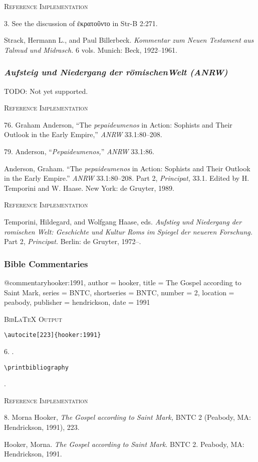 \documentclass[a4paper]{article}
\newcommand{\gr}[1]{{\greekfont #1}}
\newcommand\citetestns[3]{%
  {\textsc{BibLaTeX Output}\par
   \nobreak
   \texttt{\textbackslash autocite[#2]\{#3\}}\par
   \color{biblatex-colour}
   #1. \cite[#2]{#3}.\par
   \color{black}
   \texttt{\textbackslash printbibliography}\par
   \color{biblatex-colour}
   \hangindent\bibindent\bibentrycite{#3}.\par}}
\newenvironment{refimp}{%
  \begin{minipage}{\linewidth}
    \setlength{\parskip}{1ex}
    \textsc{Reference Implementation}\par
    \nobreak
    \color{reference-colour}
}{\end{minipage}}
\newenvironment{vb}{%
  \setlength{\parskip}{0pt}
  \verbatim}{\endverbatim}
\begin{document}
\begin{refimp}
  3. See the discussion of \gr{ἐκρατοῦντο} in Str-B 2:271.

  \hangindent\bibindent Strack, Hermann L., and Paul Billerbeck.
  \emph{Kommentar zum Neuen Testament aus Talmud und Midrasch.} 6 vols.
  Munich: Beck, 1922–1961.
\end{refimp}

\subsubsection{\emph{Aufsteig und Niedergang der römischen\newline Welt (ANRW)}}

TODO: Not yet supported.

\begin{refimp}
  76. Graham Anderson, “The \emph{pepaideumenos} in Action: Sophists and Their
  Outlook in the Early Empire,” \emph{ANRW} 33.1:80–208.

  79. Anderson, “\emph{Pepaideumenos,}” \emph{ANRW} 33.1:86.

  \hangindent\bibindent Anderson, Graham. “The \emph{pepaideumenos} in Action:
  Sophists and Their Outlook in the Early Empire.” \emph{ANRW} 33.1:80–208.
  Part 2, \emph{Principat,} 33.1. Edited by H. Temporini and W. Haase. New
  York: de Gruyter, 1989.
\end{refimp}

\begin{refimp}
  \hangindent\bibindent Temporini, Hildegard, and Wolfgang Haase, eds.
  \emph{Aufstieg und Niedergang der romischen Welt: Geschichte und Kultur Roms
  im Spiegel der neueren Forschung.} Part 2, \emph{Principat.} Berlin: de
  Gruyter, 1972–.
\end{refimp}

\subsubsection{Bible Commentaries}

\begin{vb}
@commentary{hooker:1991,
  author = hooker,
  title = {The Gospel according to Saint Mark},
  series = BNTC,
  shortseries = {BNTC},
  number = {2},
  location = peabody,
  publisher = hendrickson,
  date = {1991}
}
\end{vb}  

\citetestns{6}{223}{hooker:1991}

\begin{refimp}
  8. Morna Hooker, \emph{The Gospel according to Saint Mark,} BNTC 2 (Peabody,
  MA: Hendrickson, 1991), 223.

  \hangindent\bibindent Hooker, Morna. \emph{The Gospel according to Saint
  Mark.} BNTC 2. Peabody, MA: Hendrickson, 1991.
\end{refimp}
\end{document}

